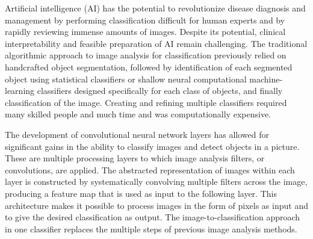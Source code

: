 \documentclass[openany,12pt,a4paper]{article}
\begin{document}
 Artificial intelligence (AI) has the potential to revolutionize disease diagnosis and management by performing classification difficult for human experts and by rapidly reviewing immense amounts of images. Despite its potential, clinical interpretability and feasible preparation of AI remain challenging. The traditional algorithmic approach to image analysis for classification previously relied on handcrafted object segmentation, followed by identification of each segmented object using statistical classifiers or shallow neural computational machine-learning classifiers designed specifically for each class of objects, and finally classification of the image. Creating and refining multiple classifiers required many skilled people and much time and was computationally expensive. 
 
 The development of convolutional neural network layers has allowed for significant gains in the ability to classify images and detect objects in a picture. These are multiple processing layers to which image analysis filters, or convolutions, are applied. The abstracted representation of images within each layer is constructed by systematically convolving multiple filters across the image, producing a feature map that is used as input to the following layer. This architecture makes it possible to process images in the form of pixels as input and to give the desired classification as output. The image-to-classification approach in one classifier replaces the multiple steps of previous image analysis methods.\cite{kermany2018identifying}\\




\printbibliography
\end{document}
